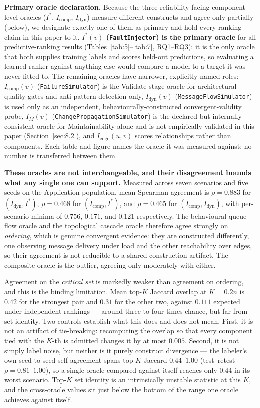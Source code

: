 \noindent\textbf{Primary oracle declaration.} Because the three reliability-facing
component-level oracles ($I^*$, $I_{\text{comp}}$, $I_{\text{dyn}}$) measure different
constructs and agree only partially (below), we designate exactly one of them as
primary and hold every ranking claim in this paper to it. \textbf{$I^*(v)$ (\texttt{FaultInjector})
is the primary oracle} for all predictive-ranking results (Tables~\ref{tab:5}--\ref{tab:7},
RQ1--RQ3): it is the only oracle that both supplies training labels and scores held-out
predictions, so evaluating a learned ranker against anything else would compare a model to a
target it was never fitted to. The remaining oracles have narrower, explicitly named roles:
$I_{\text{comp}}(v)$ (\texttt{FailureSimulator}) is the Validate-stage oracle for architectural
quality gates and anti-pattern detection only, $I_{\text{dyn}}(v)$ (\texttt{MessageFlowSimulator})
is used only as an independent, behaviourally-constructed convergent-validity probe,
$I_M(v)$ (\texttt{ChangePropagationSimulator}) is the declared but internally-consistent oracle
for Maintainability alone and is not empirically validated in this paper (Section~\ref{sec:8.2}),
and $I_{\text{edge}}(u,v)$ scores relationships rather than components. Each table and figure names
the oracle it was measured against; no number is transferred between them.

\textbf{These oracles are not interchangeable, and their disagreement bounds what any single one can
support.} Measured across seven scenarios and five seeds on the Application population, mean
Spearman agreement is $\rho = 0.883$ for $(I_{\text{dyn}}, I^*)$, $\rho = 0.468$ for
$(I_{\text{comp}}, I^*)$, and $\rho = 0.465$ for $(I_{\text{comp}}, I_{\text{dyn}})$, with
per-scenario minima of $0.756$, $0.171$, and $0.121$ respectively. The behavioural queue-flow
oracle and the topological cascade oracle therefore agree strongly on \emph{ordering}, which is
genuine convergent evidence: they are constructed differently, one observing message delivery under
load and the other reachability over edges, so their agreement is not reducible to a shared
construction artifact. The composite oracle is the outlier, agreeing only moderately with either.

Agreement on the \emph{critical set} is markedly weaker than agreement on ordering, and this is the
binding limitation. Mean top-$K$ Jaccard overlap at $K = 0.2n$ is $0.42$ for the strongest pair and
$0.31$ for the other two, against $0.111$ expected under independent rankings --- around three to
four times chance, but far from set identity. Two controls establish what this does and does not
mean. First, it is not an artifact of tie-breaking: recomputing the overlap so that every component
tied with the $K$-th is admitted changes it by at most $0.005$. Second, it is not simply
label noise, but neither is it purely construct divergence --- the labeler's own seed-to-seed
self-agreement spans top-$K$ Jaccard $0.44$--$1.00$ (test--retest $\rho = 0.81$--$1.00$), so a
single oracle compared against itself reaches only $0.44$ in its worst scenario. Top-$K$ set
identity is an intrinsically unstable statistic at this $K$, and the cross-oracle values sit just
below the bottom of the range one oracle achieves against itself.

